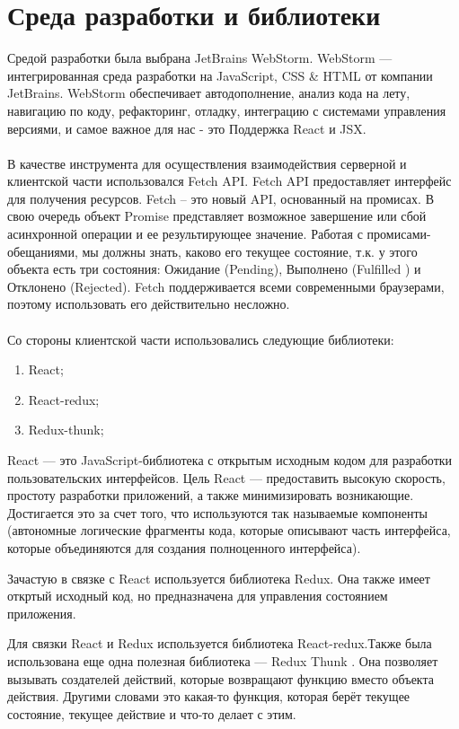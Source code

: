 \documentclass[14pt,final]{report}
\begin{document}
\section{Среда разработки и библиотеки}
Средой разработки была выбрана JetBrains WebStorm. WebStorm — интегрированная среда разработки на JavaScript, CSS & HTML от компании JetBrains. WebStorm обеспечивает автодополнение, анализ кода на лету, навигацию по коду, рефакторинг, отладку, интеграцию с системами управления версиями, и самое важное для нас - это Поддержка React и JSX.\\ 
\\
В качестве инструмента для осуществления взаимодействия серверной и клиентской части использовался Fetch API. Fetch API  предоставляет интерфейс для получения ресурсов. Fetch – это новый API, основанный на промисах. В свою очередь объект Promise представляет возможное завершение или сбой асинхронной операции и ее результирующее значение. Работая с промисами-обещаниями, мы должны знать, каково его текущее состояние, т.к. у этого объекта есть три состояния: Ожидание (Pending), Выполнено (Fulfilled ) и Отклонено (Rejected). Fetch поддерживается всеми современными браузерами, поэтому использовать его действительно несложно.
\\
\\
Со стороны клиентской части использовались следующие библиотеки:
\begin{enumerate}
    \item React;
    \item React-redux;
    \item Redux-thunk;
\end{enumerate}
React \cite{vuruh} — это JavaScript-библиотека с открытым исходным кодом для разработки пользовательских интерфейсов. Цель React — предоставить высокую скорость, простоту разработки приложений, а также минимизировать возникающие. Достигается это за счет того, что используются так называемые компоненты (автономные логические фрагменты кода, которые описывают часть интерфейса, которые объединяются для создания полноценного интерфейса).

Зачастую в связке с React используется библиотека Redux. Она также имеет откртый исходный код, но предназначена для управления состоянием приложения.

Для связки React и Redux \cite{banks} используется библиотека React-redux.Также была использована еще одна полезная библиотека — Redux Thunk \cite{thomas}. Она позволяет вызывать создателей действий, которые возвращают функцию вместо объекта действия. Другими словами это какая-то функция, которая берёт текущее состояние, текущее действие и что-то делает с этим.
\end{document}

